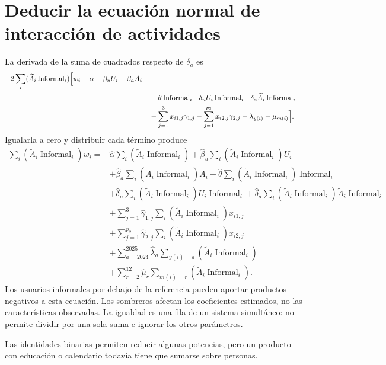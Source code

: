 \documentclass[11pt,a4paper]{article}
\begin{document}
\section{Deducir la ecuación normal de interacción de actividades}
La derivada de la suma de cuadrados respecto de $\delta_a$ es
\[
\begin{aligned}-2\sum_i(\widetilde A_i\operatorname{Informal}_i)\Bigl[w_i-\alpha-\beta_uU_i-\beta_aA_i\\&\quad-\theta\operatorname{Informal}_i-\delta_uU_i\operatorname{Informal}_i-\delta_a\widetilde A_i\operatorname{Informal}_i\\&\quad-\sum_{j=1}^3x_{i1,j}\gamma_{1,j}-\sum_{j=1}^{p_2}x_{i2,j}\gamma_{2,j}-\lambda_{y(i)}-\mu_{m(i)}\Bigr].\end{aligned}
\]
Igualarla a cero y distribuir cada término produce
\[
\begin{aligned}
\sum_i(\widetilde A_i\operatorname{Informal}_i)w_i={}&\widehat\alpha\sum_i(\widetilde A_i\operatorname{Informal}_i)
+\widehat\beta_u\sum_i(\widetilde A_i\operatorname{Informal}_i)U_i\\
&+\widehat\beta_a\sum_i(\widetilde A_i\operatorname{Informal}_i)A_i
+\widehat\theta\sum_i(\widetilde A_i\operatorname{Informal}_i)\operatorname{Informal}_i\\
&+\widehat\delta_u\sum_i(\widetilde A_i\operatorname{Informal}_i)U_i\operatorname{Informal}_i
+\widehat\delta_a\sum_i(\widetilde A_i\operatorname{Informal}_i)\widetilde A_i\operatorname{Informal}_i\\
&+\sum_{j=1}^3\widehat\gamma_{1,j}\sum_i(\widetilde A_i\operatorname{Informal}_i)x_{i1,j}\\
&+\sum_{j=1}^{p_2}\widehat\gamma_{2,j}\sum_i(\widetilde A_i\operatorname{Informal}_i)x_{i2,j}\\
&+\sum_{a=2024}^{2025}\widehat\lambda_a\sum_{y(i)=a}(\widetilde A_i\operatorname{Informal}_i)\\
&+\sum_{r=2}^{12}\widehat\mu_r\sum_{m(i)=r}(\widetilde A_i\operatorname{Informal}_i).\end{aligned}
\]
Los usuarios informales por debajo de la referencia pueden aportar productos negativos a esta ecuación.
Los sombreros afectan los coeficientes estimados, no las características observadas. La igualdad es una fila de un sistema simultáneo: no permite dividir por una sola suma e ignorar los otros parámetros.

Las identidades binarias permiten reducir algunas potencias, pero un producto con educación o calendario todavía tiene que sumarse sobre personas.
\end{document}

